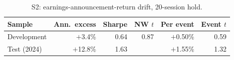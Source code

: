 \documentclass[../main.tex]{subfiles}
\begin{document}
\begin{table}[tbp]
\centering\small
\caption{S2: earnings-announcement-return drift, 20-session hold.}\label{tab:s2}
\begin{tabular}{@{}lrrrrr@{}}
\toprule
Sample & Ann.\ excess & Sharpe & NW $t$ & Per event & Event $t$ \\
\midrule
Development & $+$3.4\% & 0.64 & 0.87 & $+$0.50\% & 0.59 \\
Test (2024) & $+$12.8\% & 1.63 & & $+$1.55\% & 1.32 \\
\bottomrule
\end{tabular}
\end{table}
\end{document}
